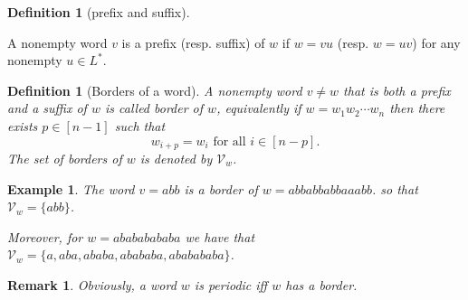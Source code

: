 \documentclass[12pt]{report}
\newtheorem{lemma}{Lemma}
\newtheorem*{remark}{Remark}
\newtheorem{defn}[mythm]{Definition}
\newtheorem{exa}[mythm]{Example}
\begin{document}
{\begin{defn}[prefix and suffix]
\end{defn}A nonempty word $v$ is a prefix (resp. suffix) of $w$ if $w=vu$ (resp. $w=uv$) for any nonempty $u \in L^*$.
\begin{defn}[Borders of a word]
A nonempty word $v \neq w$ that is both a prefix and a suffix of $w$ is called {\em border} of $w$, equivalently if $w = w_1 w_2 \cdots w_n$ then there exists $p \in [n-1]$ such that
\[ w_{i+p} = w_i \textrm{ for all } i \in [n-p]. \]
The set of borders of $w$ is denoted by $\mathcal{V}_w$.
\end{defn}

\begin{exa} The word $v=abb$ is a border of $w = a b b a b b a b b a a a b b$.
so that $\mathcal{V}_w = \{abb\}$. 

Moreover, for $w=abababababa$ we have that $\mathcal{V}_w = \{a,aba,ababa,abababa,ababababa\}$.
\end{exa}

\begin{remark}
Obviously, a word $w$ is periodic iff $w$ has a border.
\end{remark}



}
\end{document}

